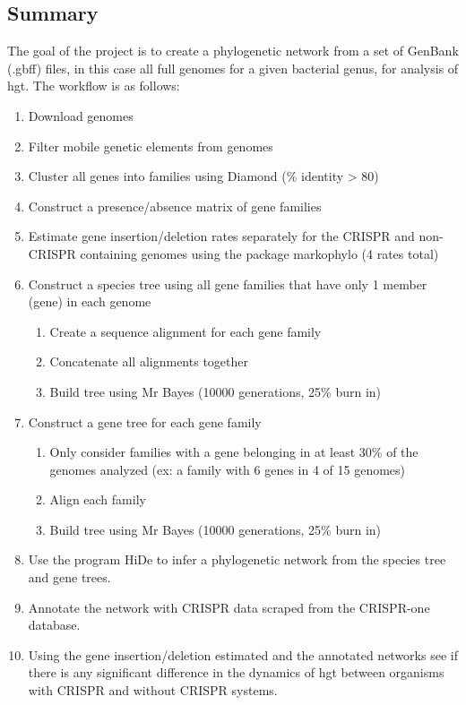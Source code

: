 \documentclass[12pt,letter]{article}
\begin{document}
\subsection*{Summary}
The goal of the project is to create a phylogenetic network from a set of GenBank (.gbff) files, in this case all full genomes for a given bacterial genus, for analysis of \ac{hgt}.
The workflow is as follows:
\begin{enumerate}
    \item Download genomes
    \item Filter mobile genetic elements from genomes
    \item Cluster all genes into families using Diamond (\% identity > 80)
    \item Construct a presence/absence matrix of gene families
    \item Estimate gene insertion/deletion rates separately for the CRISPR and non-CRISPR containing genomes using the package markophylo (4 rates total)
    \item Construct a species tree using all gene families that have only 1 member (gene) in each genome
    \begin{enumerate}
        \item Create a sequence alignment for each gene family
        \item Concatenate all alignments together
        \item Build tree using Mr Bayes (10000 generations, 25\% burn in)
    \end{enumerate}
    \item Construct a gene tree for each gene family
    \begin{enumerate}
        \item Only consider families with a gene belonging in at least 30\% of the genomes analyzed (ex: a family with 6 genes in 4 of 15 genomes)
        \item Align each family
        \item Build tree using Mr Bayes (10000 generations, 25\% burn in)
    \end{enumerate}
    \item Use the program HiDe to infer a phylogenetic network from the species tree and gene trees.
    \item Annotate the network with CRISPR data scraped from the CRISPR-one database.
    \item Using the gene insertion/deletion estimated and the annotated networks see if there is any significant difference in the dynamics of \ac{hgt} between organisms with CRISPR and without CRISPR systems.
\end{enumerate}
\end{document}
